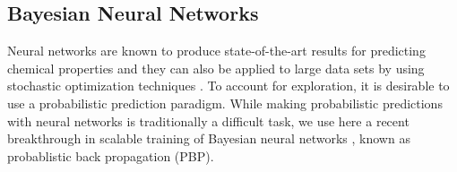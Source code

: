 \subsection{Bayesian Neural Networks}


Neural networks are known to produce state-of-the-art results for predicting chemical properties 
\cite{Ma_2015,Mayr_2016,ramsundar2015massively} and they can also be applied to large data sets by using 
stochastic optimization techniques \cite{bousquet2008tradeoffs}. To account for exploration, it is desirable to use a probabilistic prediction paradigm. While making probabilistic predictions with neural networks is traditionally a difficult task, we use here a recent breakthrough in scalable training of Bayesian neural networks \cite{hernandez2015probabilistic}, known as probablistic back propagation (PBP). 

